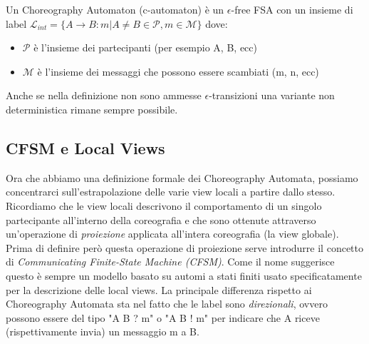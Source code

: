 \begin{definition}
    \label{def:Choreography_Automata}
    Un Choreography Automaton (c-automaton) è un $\epsilon$-free FSA con un insieme di label $\mathcal{L}_{int} = \{ A \rightarrow B : m | A \neq B \in \mathcal{P}, m \in \mathcal{M} \}$ dove:
    \begin{itemize}
        \item $\mathcal{P}$ è l'insieme dei partecipanti (per esempio A, B, ecc)
        \item $\mathcal{M}$ è l'insieme dei messaggi che possono essere scambiati (m, n, ecc)
    \end{itemize}
\end{definition}
\begin{remark}
    Anche se nella definizione non sono ammesse $\epsilon$-transizioni una variante non deterministica rimane sempre possibile.
\end{remark}

\subsection{CFSM e Local Views}
Ora che abbiamo una definizione formale dei Choreography Automata, possiamo concentrarci sull'estrapolazione delle varie view locali a partire dallo stesso. Ricordiamo che le view locali descrivono il comportamento di un singolo partecipante all'interno della coreografia e che sono ottenute attraverso un'operazione di \emph{proiezione} applicata all'intera coreografia (la view globale). Prima di definire però questa operazione di proiezione serve introdurre il concetto di \emph{Communicating Finite-State Machine (CFSM)}\cite{CFSM}. Come il nome suggerisce questo è sempre un modello basato su automi a stati finiti usato specificatamente per la descrizione delle local views. La principale differenza rispetto ai Choreography Automata sta nel fatto che le label sono \emph{direzionali}, ovvero possono essere del tipo "A B ? m" o "A B ! m" per indicare che A riceve (rispettivamente invia) un messaggio m a B.

